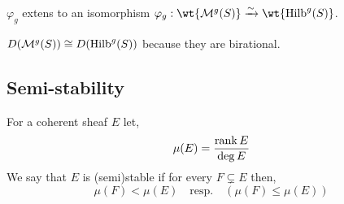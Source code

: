 \documentclass[12pt]{article}
\begin{document}
\begin{prop}
$\varphi_g$ extens to an isomorphism $\varphi_g : \wt{\mathcal{M}^g(S)} \iso \wt{\Hilb^g(S)}$.
\end{prop}

\begin{thm}[$\star$]
$D(\mathcal{M}^g(S)) \cong D(\mathrm{Hilb}^g(S))$ because they are birational.
\end{thm}

\subsection{Semi-stability}

\begin{defn}
For a coherent sheaf $E$ let,
\[ \mu(E) = \frac{\operatorname{\mathrm{rank}}{E}}{\deg{E}} \]
We say that $E$ is (semi)stable if for every $F \subsetneq E$ then,
\[ \mu(F) < \mu(E) \quad \text{resp.} \quad (\mu(F) \le \mu(E)) \]
\end{defn}
\end{document}
